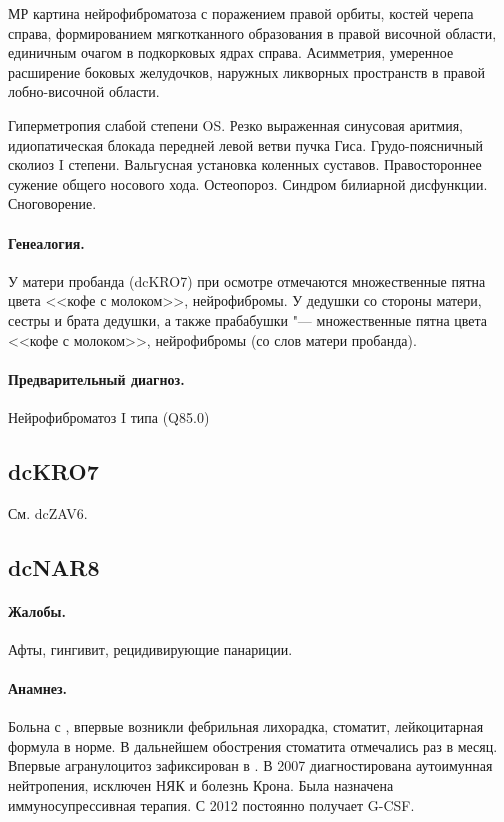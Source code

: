 \documentclass[a4paper,14pt]{extarticle}
\newcommand{\months}{мес.}
\begin{document}
МР картина нейрофиброматоза с поражением правой орбиты, костей черепа справа, формированием мягкотканного образования в правой височной области, единичным очагом в подкорковых ядрах справа. 
Асимметрия, умеренное расширение боковых желудочков, наружных ликворных пространств в правой лобно-височной области.

Гиперметропия слабой степени OS.
Резко выраженная синусовая аритмия, идиопатическая блокада передней левой ветви пучка Гиса.
Грудо-поясничный сколиоз I степени.
Вальгусная установка коленных суставов.
Правостороннее сужение общего носового хода.
Остеопороз.
Синдром билиарной дисфункции.
Сноговорение.

\paragraph{Генеалогия.}
У матери пробанда (dcKRO7) при осмотре отмечаются множественные пятна цвета <<кофе с молоком>>, нейрофибромы.
У дедушки со стороны матери, сестры и брата дедушки, а также прабабушки "--- множественные пятна цвета <<кофе с молоком>>, нейрофибромы (со слов матери пробанда).

\paragraph{Предварительный диагноз.}
Нейрофиброматоз I типа (Q85.0)

\subsection*{dcKRO7}

См. dcZAV6.

\subsection*{dcNAR8}

\paragraph{Жалобы.}
Афты, гингивит, рецидивирующие панариции.

\paragraph{Анамнез.}
Больна с  \numprint[\months]{9}, впервые возникли фебрильная лихорадка, стоматит, лейкоцитарная формула в норме.
В дальнейшем обострения стоматита отмечались раз в месяц.
Впервые агранулоцитоз зафиксирован в  \numprint[\months]{7}.
В 2007 диагностирована аутоимунная нейтропения, исключен НЯК и болезнь Крона.
Была назначена иммуносупрессивная терапия.
С 2012 постоянно получает G-CSF.
\end{document}
